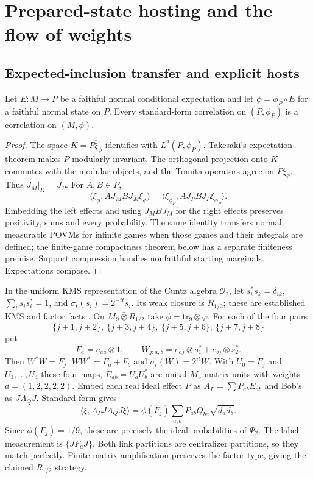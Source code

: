 \section{Prepared-state hosting and the flow of weights}\label{sec:hosting}
\subsection{Expected-inclusion transfer and explicit hosts}
\begin{lemma}\label{lem:transfer}
Let $E:M\to P$ be a faithful normal conditional expectation and let $\phi=\phi_P\circ E$ for a faithful normal state on $P$. Every standard-form correlation on $(P,\phi_P)$ is a correlation on $(M,\phi)$.
\end{lemma}
\begin{proof}
The space $K=\overline{P\xi_\phi}$ identifies with $L^2(P,\phi_P)$. Takesaki's expectation theorem \cite{Takesaki} makes $P$ modularly invariant. The orthogonal projection onto $K$ commutes with the modular objects, and the Tomita operators agree on $P\xi_\phi$. Thus $J_M|_K=J_P$. For $A,B\in P$,
\[
 \langle\xi_\phi,AJ_MB J_M\xi_\phi\rangle
 =\langle\xi_{\phi_P},AJ_PB J_P\xi_{\phi_P}\rangle.
\]
Embedding the left effects and using $J_MB J_M$ for the right effects preserves positivity, sums and every probability. The same identity transfers normal measurable POVMs for infinite games when those games and their integrals are defined; the finite-game compactness theorem below has a separate finiteness premise. Support compression handles nonfaithful starting marginals. Expectations compose.
\end{proof}
In the uniform KMS representation of the Cuntz algebra $\mathcal O_2$, let $s_i^*s_k=\delta_{ik}$, $\sum_i s_is_i^*=1$, and $\sigma_t(s_i)=2^{-it}s_i$. Its weak closure is $R_{1/2}$; these are established KMS and factor facts \cite{CK,Harris}. On $M_9\bar\otimes R_{1/2}$ take $\phi=\mathrm{tr}_9\otimes\varphi$. For each of the four pairs
\[
 \{j+1,j+2\},\ \{j+3,j+4\},\ \{j+5,j+6\},\ \{j+7,j+8\}
\]
put
\[
 F_a=e_{aa}\otimes1,\qquad W_{j;a,b}=e_{aj}\otimes s_1^*+e_{bj}\otimes s_2^*.
\]
Then $W^*W=F_j$, $WW^*=F_a+F_b$ and $\sigma_t(W)=2^{it}W$. With $U_0=F_j$ and $U_1,\ldots,U_4$ these four maps, $E_{ab}=U_aU_b^*$ are unital $M_5$ matrix units with weights $d=(1,2,2,2,2)$. Embed each real ideal effect $P$ as $A_P=\sum P_{ab}E_{ab}$ and Bob's as $JA_QJ$. Standard form gives
\begin{equation}\label{eq:block}
 \langle\xi,A_PJA_QJ\xi\rangle
 =\phi(F_j)\sum_{a,b}P_{ab}Q_{ba}\sqrt{d_ad_b}.
\end{equation}
Since $\phi(F_j)=1/9$, these are precisely the ideal probabilities of $\Psi_2$. The label measurement is $\{JF_aJ\}$. Both link partitions are centralizer partitions, so they match perfectly. Finite matrix amplification preserves the factor type, giving the claimed $R_{1/2}$ strategy.

